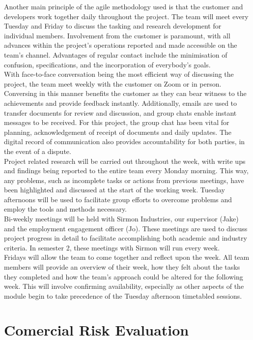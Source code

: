 \documentclass [12pt]{article}
\begin{document}
Another main principle of the agile methodology used is that the customer and developers work together daily throughout the project. The team will meet every Tuesday and Friday to discuss the tasking and research development for individual members. Involvement from the customer is paramount, with all advances within the project's operations reported and made accessible on the team's channel. Advantages of regular contact include the minimisation of confusion, specifications, and the incorporation of everybody's goals.
\\
With face-to-face conversation being the most efficient way of discussing the project, the team meet weekly with the customer on Zoom or in person. Conversing in this manner benefits the customer as they can bear witness to the achievements and provide feedback instantly. Additionally, emails are used to transfer documents for review and discussion, and group chats enable instant messages to be received. For this project, the group chat has been vital for planning, acknowledgement of receipt of documents and daily updates. The digital record of communication also provides accountability for both parties, in the event of a dispute.
\\
Project related research will be carried out throughout the week, with write ups and findings being reported to the entire team every Monday morning. This way, any problems, such as incomplete tasks or actions from previous meetings, have been highlighted and discussed at the start of the working week. Tuesday afternoons will be used to facilitate group efforts to overcome problems and employ the tools and methods necessary.
\\
Bi-weekly meetings will be held with Sirmon Industries, our supervisor (Jake) and the employment engagement officer (Jo). These meetings are used to discuss project progress in detail to facilitate accomplishing both academic and industry criteria. In semester 2, these meetings with Sirmon will run every week.
\\
Fridays will allow the team to come together and reflect upon the week. All team members will provide an overview of their week, how they felt about the tasks they completed and how the team’s approach could be altered for the following week. This will involve confirming availability, especially as other aspects of the module begin to take precedence of the Tuesday afternoon timetabled sessions.



\section{Comercial Risk Evaluation}\label{sec:Commercial_Risk}
\end{document}
